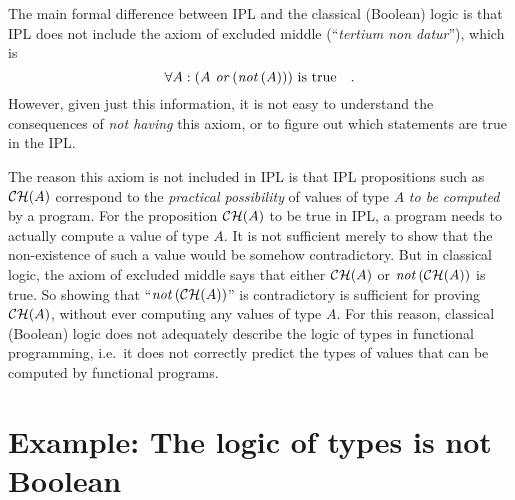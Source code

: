 The main formal difference between IPL and the classical (Boolean)
logic is that IPL does not include the axiom of excluded middle (``\emph{tertium
non datur}''), which is 
\[
\forall A:(A\text{\emph{ or}}\left(\text{\emph{not}}\left(A\right)\right))\text{ is true}\quad.
\]
However, given just this information, it is not easy to understand
the consequences of \emph{not having} this axiom, or to figure out
which statements are true in the IPL. 

The reason this axiom is not included in IPL is that IPL propositions
such as ${\cal CH}(A)$ correspond to the \emph{practical possibility}
of values of type $A$ \emph{to be computed} by a program. For the
proposition ${\cal CH}(A)$ to be true in IPL, a program needs to
actually compute a value of type $A$. It is not sufficient merely
to show that the non-existence of such a value would be somehow contradictory.
But in classical logic, the axiom of excluded middle says that either
${\cal CH}(A)$ or $\text{\emph{not}}\left({\cal CH}(A)\right)$ is
true. So showing that ``$\text{\emph{not}}\left({\cal CH}(A)\right)$''
is contradictory is sufficient for proving ${\cal CH}(A)$, without
ever computing any values of type $A$. For this reason, classical
(Boolean) logic does not adequately describe the logic of types in
functional programming, i.e.~it does not correctly predict the types
of values that can be computed by functional programs.

\section{Example: The logic of types is not Boolean}

